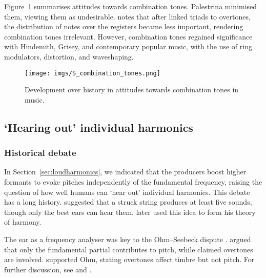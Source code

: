 \documentclass{article}
\begin{document}

Figure~\ref{fig:S_combination} summarises attitudes towards combination tones. Palestrina minimised them, viewing them as undesirable. \citet{kursell2015third} notes that after \citet{rameau1722traite} linked triads to overtones, the distribution of notes over the registers became less important, rendering combination tones irrelevant. However, combination tones regained significance with Hindemith, Grisey, and contemporary popular music, with the use of ring modulators, distortion, and waveshaping.



\begin{figure}
  \centering
  \texttt{[image: imgs/S\_combination\_tones.png]}
  \caption{Development over history in attitudes towards combination tones in music.}
\label{fig:S_combination}
\end{figure}


\subsection{`Hearing out' individual harmonics}\label{ref:individualharmonics}

\subsubsection{Historical debate}\label{sec:ohmseebeck}

In Section~\ref{sec:loudharmonics}, we indicated that the producers boost higher formants to evoke pitches independently of the fundamental frequency, raising the question of how well humans can `hear out' individual harmonics. This debate has a long history. \citet{mersenne1636harmonie} suggested that a struck string produces at least five sounds, though only the best ears can hear them. \citet[pp.~13--14]{rameau1750demonstration} later used this idea to form his theory of harmony.


The ear as a frequency analyser was key to the Ohm--Seebeck dispute \citep{turner1977ohm}. \citet{ohm1843definition} argued that only the fundamental partial contributes to pitch, while \citet{seebeck1843definition} claimed overtones are involved. \citet[pp.~58--59]{helmoltz1885sensations} supported Ohm, stating overtones affect timbre but not pitch. For further discussion, see \citet{plomp1964ear,plomp2001intelligent} and \citet{turner1977ohm}. %
\end{document}
